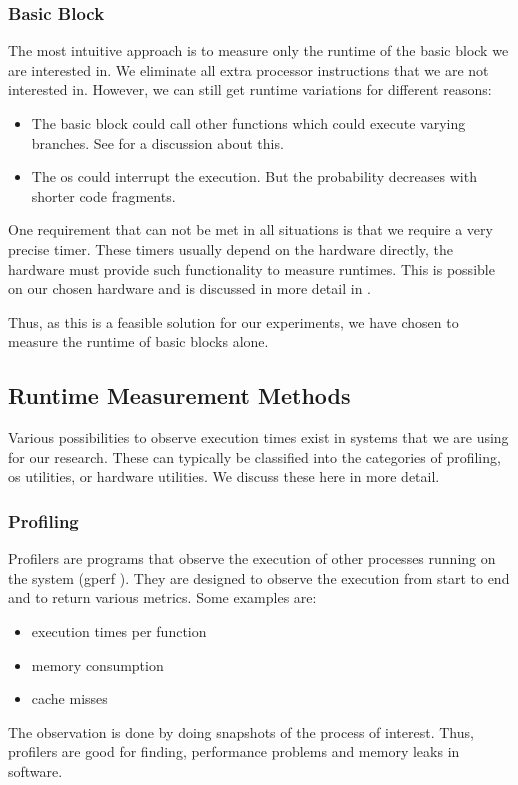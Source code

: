 \subsubsection{Basic Block}
\tobechecked
The most intuitive approach is to measure only the runtime of the basic block we are interested in.
We eliminate all extra processor instructions that we are not interested in.
However, we can still get runtime variations for different reasons:
\begin{itemize}
    \item The basic block could call other functions which could execute varying branches. 
          See  for a discussion about this.
    \item The \ac{os} could interrupt the execution. 
          But the probability decreases with shorter code fragments.
\end{itemize}

One requirement that can not be met in all situations is that we require a very precise timer.
These timers usually depend on the hardware directly, \ie the hardware must provide such functionality to measure runtimes.
This is possible on our chosen hardware and is discussed in more detail in .

Thus, as this is a feasible solution for our experiments, we have chosen to measure the runtime of basic blocks alone.
    
\subsection{Runtime Measurement Methods}
\tobechecked
\label{sec:approach:datageneration:runtime_methods}
Various possibilities to observe execution times exist in systems that we are using for our research.
These can typically be classified into the categories of profiling, \ac{os} utilities, or hardware utilities.
We discuss these here in more detail.

\subsubsection{Profiling}
\tobechecked
Profilers are programs that observe the execution of other processes running on the system (\eg gperf \cite{graham1982gprof}).
They are designed to observe the execution from start to end and to return various metrics. Some examples are:
\begin{itemize}
    \item execution times per function
    \item memory consumption
    \item cache misses
\end{itemize}
The observation is done by doing snapshots of the process of interest.
Thus, profilers are good for finding, \eg performance problems and memory leaks in software.

